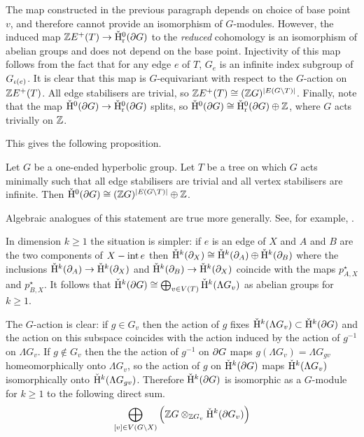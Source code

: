 The map constructed in the previous paragraph depends on choice of base point $v$, and therefore cannot provide an isomorphism of $G$-modules.
However, the induced map $\mathbb{Z} E^{+}(T) \to \check{\mathrm{H}}{}^0_{\mathrm{r}}(\partial G)$ to the \emph{reduced} cohomology is an isomorphism of abelian groups and does not depend on the base point.
Injectivity of this map follows from the fact that for any edge $e$ of $T$, $G_e$ is an infinite index subgroup of $G_{\operatorname{\iota}(e)}$.
It is clear that this map is $G$-equivariant with respect to the $G$-action on $\mathbb{Z} E^{+}(T)$.
All edge stabilisers are trivial, so $\mathbb{Z} E^{+}(T) \cong (\mathbb{Z} G)^{\vert E(G\backslash T)\vert}$.
Finally, note that the map $\check{\mathrm{H}}{}^0(\partial G) \to \check{\mathrm{H}}{}^0_{\mathrm{r}}(\partial G)$ splits, so $\check{\mathrm{H}}{}^0(\partial G) \cong \check{\mathrm{H}}{}^0_{\mathrm{r}}(\partial G) \oplus \mathbb{Z}$, where $G$ acts trivially on $\mathbb{Z}$.

This gives the following proposition. 

\begin{proposition}\label{proposition:0th_cohomology_from_dunwoody_decomposition}
  Let $G$ be a one-ended hyperbolic group.
  Let $T$ be a tree on which $G$ acts minimally such that all edge stabilisers are trivial and all vertex stabilisers are infinite.
  Then $\check{\mathrm{H}}{}^0(\partial G) \cong (\mathbb{Z} G)^{\vert E(G\backslash T)\vert} \oplus \mathbb{Z}$.
\end{proposition}

\begin{remark}
  Algebraic analogues of this statement are true more generally.
  See, for example, \cite[Section 13.5]{geoghegan08}.
\end{remark}

In dimension $k \geq 1$ the situation is simpler: if $e$ is an edge of $X$ and $A$ and $B$ are the two components of $X - \operatorname{int} e$ then $\check{\mathrm{H}}{}^k(\partial_X) \cong \check{\mathrm{H}}{}^k(\partial_A) \oplus \check{\mathrm{H}}{}^k(\partial_B)$ where the inclusions $\check{\mathrm{H}}{}^k(\partial_A) \to \check{\mathrm{H}}{}^k(\partial_X)$ and $\check{\mathrm{H}}{}^k(\partial_B) \to \check{\mathrm{H}}{}^k(\partial_X)$ coincide with the maps $p_{A,X}^\star$ and $p_{B,X}^\star$.
It follows that $\check{\mathrm{H}}{}^k(\partial G) \cong \bigoplus_{v \in V(T)}\check{\mathrm{H}}{}^k(\Lambda G_v)$ as abelian groups for $k \geq 1$.

The $G$-action is clear: if $g \in G_v$ then the action of $g$ fixes $\check{\mathrm{H}}{}^k(\Lambda G_v) \subset \check{\mathrm{H}}{}^k(\partial G)$ and the action on this subspace coincides with the action induced by the action of $g^{-1}$ on $\Lambda G_v$.
If $g \notin G_v$ then the the action of $g^{-1}$ on $\partial G$ maps $g(\Lambda G_v) = \Lambda G_{gv}$ homeomorphically onto $\Lambda G_v$, so the action of $g$ on $\check{\mathrm{H}}{}^k(\partial G)$ maps $\check{\mathrm{H}}{}^k(\Lambda G_v)$ isomorphically onto $\check{\mathrm{H}}{}^k(\Lambda G_{gv})$.
Therefore $\check{\mathrm{H}}{}^k(\partial G)$ is isomorphic as a $G$-module for $k \geq 1$ to the following direct sum.
\begin{align}\label{equation:finite_edge_group_direct_sum}
  \bigoplus_{[v] \in V(G\backslash X)} \left(\mathbb{Z} G \otimes_{\mathbb{Z} G_v} \check{\mathrm{H}}{}^k(\partial G_v)\right)
\end{align}

